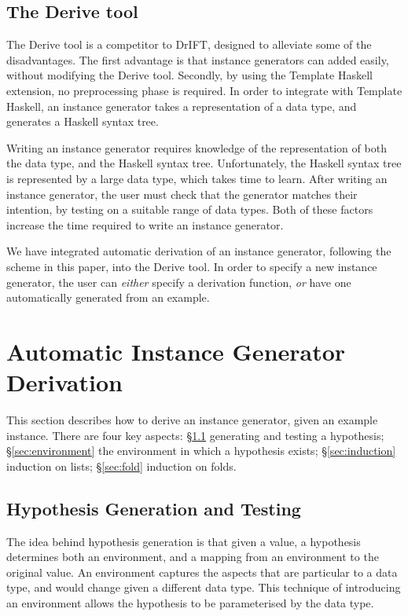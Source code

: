\documentclass{llncs}
\begin{document}
\subsection{The Derive tool}

The Derive tool \cite{derive} is a competitor to DrIFT, designed to alleviate some of the disadvantages. The first advantage is that instance generators can added easily, without modifying the Derive tool. Secondly, by using the Template Haskell \cite{template_haskell} extension, no preprocessing phase is required. In order to integrate with Template Haskell, an instance generator takes a representation of a data type, and generates a Haskell syntax tree.

Writing an instance generator requires knowledge of the representation of both the data type, and the Haskell syntax tree. Unfortunately, the Haskell syntax tree is represented by a large data type, which takes time to learn. After writing an instance generator, the user must check that the generator matches their intention, by testing on a suitable range of data types. Both of these factors increase the time required to write an instance generator.

We have integrated automatic derivation of an instance generator, following the scheme in this paper, into the Derive tool. In order to specify a new instance generator, the user can \textit{either} specify a derivation function, \textit{or} have one automatically generated from an example.


\section{Automatic Instance Generator Derivation}
\label{sec:automatic_instances}

This section describes how to derive an instance generator, given an example instance. There are four key aspects: \S\ref{sec:generation} generating and testing a hypothesis; \S\ref{sec:environment} the environment in which a hypothesis exists; \S\ref{sec:induction} induction on lists; \S\ref{sec:fold} induction on folds.

\subsection{Hypothesis Generation and Testing}
\label{sec:generation}

The idea behind hypothesis generation is that given a value, a hypothesis determines both an environment, and a mapping from an environment to the original value. An environment captures the aspects that are particular to a data type, and would change given a different data type. This technique of introducing an environment allows the hypothesis to be parameterised by the data type.
\end{document}
